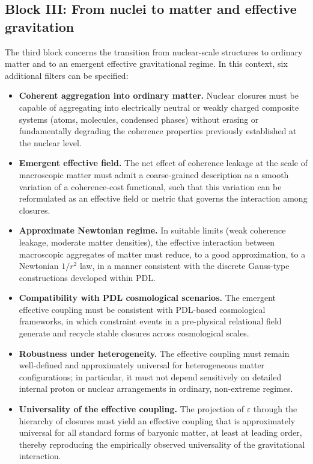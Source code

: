 \documentclass[11pt,a4paper]{article}
\theoremstyle{definition}
\begin{document}
\subsection{Block III: From nuclei to matter and effective gravitation}

The third block concerns the transition from nuclear-scale structures to ordinary matter and to an emergent effective gravitational regime. In this context, six additional filters can be specified:\cite{Exponent_18_PDL_2026,Effective_Fields_PDL_2026}

\begin{itemize}
  \item[(III1)] \textbf{Coherent aggregation into ordinary matter.} Nuclear closures must be capable of aggregating into electrically neutral or weakly charged composite systems (atoms, molecules, condensed phases) without erasing or fundamentally degrading the coherence properties previously established at the nuclear level.
  \item[(III2)] \textbf{Emergent effective field.} The net effect of coherence leakage at the scale of macroscopic matter must admit a coarse-grained description as a smooth variation of a coherence-cost functional, such that this variation can be reformulated as an effective field or metric that governs the interaction among closures.\cite{Effective_Fields_PDL_2026,Proper_Time_PDL_2026}
  \item[(III3)] \textbf{Approximate Newtonian regime.} In suitable limits (weak coherence leakage, moderate matter densities), the effective interaction between macroscopic aggregates of matter must reduce, to a good approximation, to a Newtonian $1/r^2$ law, in a manner consistent with the discrete Gauss-type constructions developed within PDL.\cite{Effective_Fields_PDL_2026,PDL_Global_Mapping_2026}
  \item[(III4)] \textbf{Compatibility with PDL cosmological scenarios.} The emergent effective coupling must be consistent with PDL-based cosmological frameworks, in which constraint events in a pre-physical relational field generate and recycle stable closures across cosmological scales.\cite{PDL_Main_2026,PDL_Global_Mapping_2026}
  \item[(III5)] \textbf{Robustness under heterogeneity.} The effective coupling must remain well-defined and approximately universal for heterogeneous matter configurations; in particular, it must not depend sensitively on detailed internal proton or nuclear arrangements in ordinary, non-extreme regimes.\cite{Exponent_18_PDL_2026}
  \item[(III6)] \textbf{Universality of the effective coupling.} The projection of $\varepsilon$ through the hierarchy of closures must yield an effective coupling that is approximately universal for all standard forms of baryonic matter, at least at leading order, thereby reproducing the empirically observed universality of the gravitational interaction.\cite{Exponent_18_PDL_2026,PDL_Global_Mapping_2026}
\end{itemize}
\end{document}
